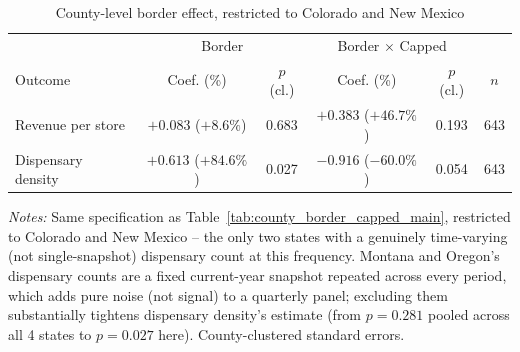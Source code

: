 \begin{table}[htbp]
\centering
\caption{County-level border effect, restricted to Colorado and New Mexico}
\label{tab:county_border_capped_conm}
\footnotesize
\begin{tabular}{lccccc}
\toprule
& \multicolumn{2}{c}{Border} & \multicolumn{2}{c}{Border $\times$ Capped} & \\
Outcome & Coef. (\%) & $p$ (cl.) & Coef. (\%) & $p$ (cl.) & $n$ \\
\midrule
Revenue per store & $+0.083$ ($+8.6\%$) & 0.683 & $+0.383$ ($+46.7\%$) & 0.193 & 643 \\
Dispensary density & $+0.613$ ($+84.6\%$) & 0.027 & $-0.916$ ($-60.0\%$) & 0.054 & 643 \\
\bottomrule
\end{tabular}
\begin{minipage}{0.95\textwidth}
\vspace{0.3em}
\footnotesize
\textit{Notes:} Same specification as Table~\ref{tab:county_border_capped_main}, restricted to Colorado and
New Mexico -- the only two states with a genuinely time-varying (not single-snapshot) dispensary count at
this frequency. Montana and Oregon's dispensary counts are a fixed current-year snapshot repeated across every
period, which adds pure noise (not signal) to a quarterly panel; excluding them substantially tightens
dispensary density's estimate (from $p=0.281$ pooled across all 4 states to $p=0.027$ here). County-clustered
standard errors.
\end{minipage}
\end{table}

